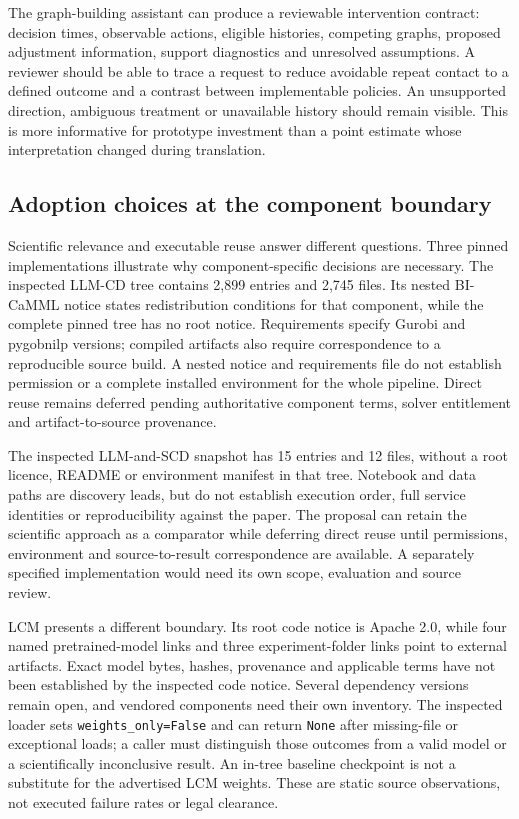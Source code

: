 The graph-building assistant can produce a reviewable intervention contract: decision times, observable actions, eligible histories, competing graphs, proposed adjustment information, support diagnostics and unresolved assumptions. A reviewer should be able to trace a request to reduce avoidable repeat contact to a defined outcome and a contrast between implementable policies. An unsupported direction, ambiguous treatment or unavailable history should remain visible. This is more informative for prototype investment than a point estimate whose interpretation changed during translation.

\subsection{Adoption choices at the component boundary}

Scientific relevance and executable reuse answer different questions. Three pinned implementations illustrate why component-specific decisions are necessary. The inspected LLM-CD tree contains 2,899 entries and 2,745 files. Its nested BI-CaMML notice states redistribution conditions for that component, while the complete pinned tree has no root notice. Requirements specify Gurobi and pygobnilp versions; compiled artifacts also require correspondence to a reproducible source build. A nested notice and requirements file do not establish permission or a complete installed environment for the whole pipeline. Direct reuse remains deferred pending authoritative component terms, solver entitlement and artifact-to-source provenance.~\citep{exec28_lm_artifacts}

The inspected LLM-and-SCD snapshot has 15 entries and 12 files, without a root licence, README or environment manifest in that tree. Notebook and data paths are discovery leads, but do not establish execution order, full service identities or reproducibility against the paper. The proposal can retain the scientific approach as a comparator while deferring direct reuse until permissions, environment and source-to-result correspondence are available. A separately specified implementation would need its own scope, evaluation and source review.~\citep{exec28_lm_artifacts}

LCM presents a different boundary. Its root code notice is Apache 2.0, while four named pretrained-model links and three experiment-folder links point to external artifacts. Exact model bytes, hashes, provenance and applicable terms have not been established by the inspected code notice. Several dependency versions remain open, and vendored components need their own inventory. The inspected loader sets \texttt{weights\_only=False} and can return \texttt{None} after missing-file or exceptional loads; a caller must distinguish those outcomes from a valid model or a scientifically inconclusive result. An in-tree baseline checkpoint is not a substitute for the advertised LCM weights. These are static source observations, not executed failure rates or legal clearance.~\citep{exec28_lm_artifacts}

